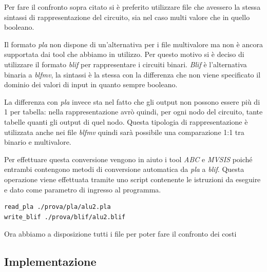 \documentclass[
  italian,
]{book}
\begin{document}
Per fare il confronto sopra citato si è preferito utilizzare file che avessero la stessa sintassi di rappresentazione del circuito, sia nel caso multi valore che in quello booleano.

Il formato \emph{pla} non dispone di un'alternativa per i file multivalore ma non è ancora supportata dai tool che abbiamo in utilizzo. Per questo motivo si è deciso di utilizzare il formato \emph{blif} per rappresentare i circuiti binari. \emph{Blif} è l'alternativa binaria a \emph{blfmv}, la sintassi è la stessa con la differenza che non viene specificato il dominio dei valori di input in quanto sempre booleano.

La differenza con \emph{pla} invece sta nel fatto che gli output non possono essere più di 1 per tabella: nella rappresentazione avrò quindi, per ogni nodo del circuito, tante tabelle quanti gli output di quel nodo. Questa tipologia di rappresentazione è utilizzata anche nei file \emph{blfmv} quindi sarà possibile una comparazione 1:1 tra binario e multivalore.

Per effettuare questa conversione vengono in aiuto i tool \emph{ABC} e \emph{MVSIS} poiché entrambi contengono metodi di conversione automatica da \emph{pla} a \emph{blif}. Questa operazione viene effettuata tramite uno script contenente le istruzioni da eseguire e dato come parametro di ingresso al programma.

\begin{verbatim}
read_pla ./prova/pla/alu2.pla
write_blif ./prova/blif/alu2.blif
\end{verbatim}

Ora abbiamo a disposizione tutti i file per poter fare il confronto dei costi

\hypertarget{implementazione}{%
\subsection{Implementazione}\label{implementazione}}
\end{document}

